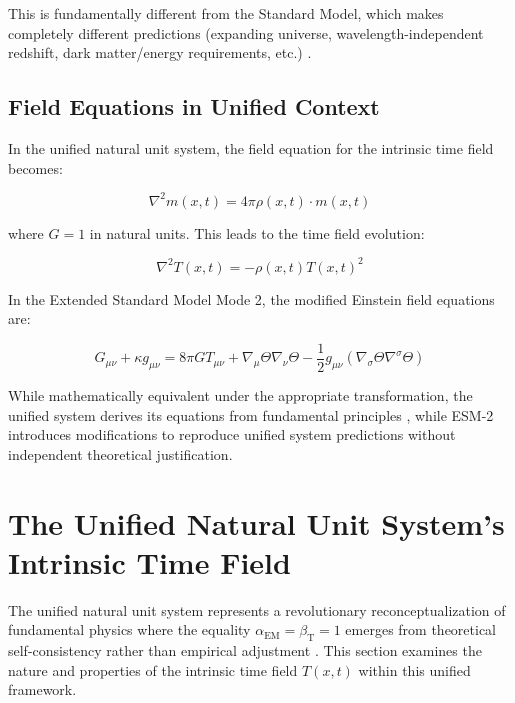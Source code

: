 \documentclass[12pt,a4paper]{article}
\newcommand{\Tfieldt}{T(x,t)}
\newcommand{\alphaEM}{\alpha_{\text{EM}}}
\newcommand{\betaT}{\beta_{\text{T}}}
\begin{document}
	This is fundamentally different from the Standard Model, which makes completely different predictions (expanding universe, wavelength-independent redshift, dark matter/energy requirements, etc.) \cite{Riess1998,McGaugh2016}.
	
	\subsection{Field Equations in Unified Context}
	\label{subsec:field_equations_unified}
	
	In the unified natural unit system, the field equation for the intrinsic time field becomes:
	
	\begin{equation}
		\nabla^2 m(x,t) = 4\pi \rho(x,t) \cdot m(x,t)
	\end{equation}
	
	where $G = 1$ in natural units. This leads to the time field evolution:
	
	\begin{equation}
		\nabla^2 \Tfieldt = -\rho(x,t) \Tfieldt^2
	\end{equation}
	
	In the Extended Standard Model Mode 2, the modified Einstein field equations are:
	
	\begin{equation}
		G_{\mu\nu} + \kappa g_{\mu\nu} = 8\pi G T_{\mu\nu} + \nabla_{\mu}\Theta\nabla_{\nu}\Theta - \frac{1}{2}g_{\mu\nu}(\nabla_{\sigma}\Theta\nabla^{\sigma}\Theta)
	\end{equation}
	
	While mathematically equivalent under the appropriate transformation, the unified system derives its equations from fundamental principles \cite{pascher_lagrangian_2025}, while ESM-2 introduces modifications to reproduce unified system predictions without independent theoretical justification.
	
	\section{The Unified Natural Unit System's Intrinsic Time Field}
	\label{sec:unified_time_field}
	
	The unified natural unit system represents a revolutionary reconceptualization of fundamental physics where the equality $\alphaEM = \betaT = 1$ emerges from theoretical self-consistency rather than empirical adjustment \cite{pascher_unified_2025}. This section examines the nature and properties of the intrinsic time field $\Tfieldt$ within this unified framework.
	
\end{document}
